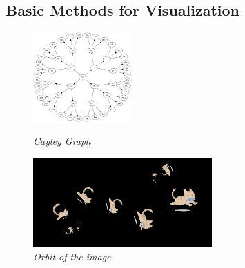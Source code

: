 \subsection{Basic Methods for Visualization}

\begin{figure}[htbp]
 \begin{minipage}[t]{0.333\hsize}
  \center
  \includegraphics[height=1.35in, keepaspectratio]{img/cayleyGraph.png}
  \caption{\textit{Cayley Graph}}
  \label{fig:cayleyGraph}
  \hspace*{\fill}
 \end{minipage}
 \begin{minipage}[t]{0.666\hsize}
  \center
  \includegraphics[height=1.35in, keepaspectratio]{img/preparation/basic/catsOrbit.png}
  \caption{\textit{Orbit of the image}}
  \label{fig:orbitCat}
  \hspace*{\fill}
 \end{minipage}
\end{figure}

